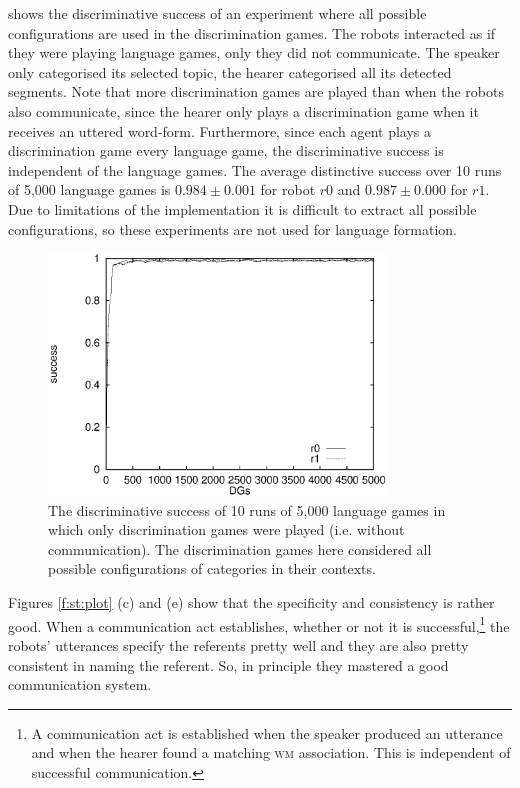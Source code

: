  shows the discriminative success of an experiment where all possible configurations are used in the discrimination games. The robots interacted as if they were playing language games, only they did not communicate. The speaker only categorised its selected topic, the hearer categorised all its detected segments. Note that more discrimination games are played than when the robots also communicate, since the hearer only plays a discrimination game when it receives an uttered word-form. Furthermore, since each agent plays a discrimination game every language game, the discriminative success is independent of the language games. The average distinctive success over 10 runs of 5,000 language games is $0.984 \pm 0.001$ for robot $r0$ and $0.987 \pm 0.000$ for $r1$. Due to limitations of the implementation it is difficult to extract all possible configurations, so these experiments are not used for language formation.

\begin{figure}[t]
\centerline{\includegraphics[width=9cm]{basic/dsall.eps}}
\caption{The discriminative success of 10 runs of 5,000 language games in which only discrimination games were played (i.e. without communication). The discrimination games here considered all possible configurations of categories in their contexts.}
\label{f:st:ds}
\end{figure}

Figures \ref{f:st:plot} (c) and (e) show that the specificity and consistency is rather good. When a communication act establishes, whether or not it is successful,\footnote{A communication act is established when the speaker produced an utterance and when the hearer found a matching {\scshape wm} association. This is independent of successful communication.} the robots' utterances specify the referents pretty well and they are also pretty consistent in naming the referent. So, in principle they mastered a good communication system.

